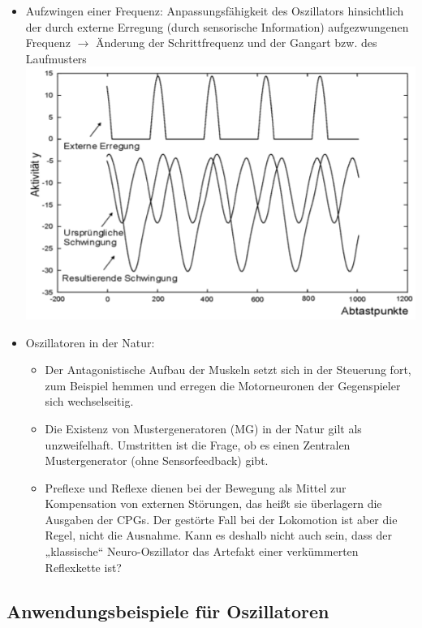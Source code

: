 \begin{itemize}
\begin{figure}[h!]
\begin{subfigure}{.4\textwidth}
		\caption{Oszillatordynamik}
		\label{OD}
	\end{subfigure}
\end{figure}
\item Aufzwingen einer Frequenz: Anpassungsfähigkeit des Oszillators hinsichtlich der durch
externe Erregung (durch sensorische Information) aufgezwungenen Frequenz $\rightarrow$ Änderung der Schrittfrequenz und der Gangart bzw. des Laufmusters\\
\includegraphics[width=.4\textwidth]{figures/ch05_freq.png}
\item Oszillatoren in der Natur:
\begin{itemize}
\item Der Antagonistische Aufbau der Muskeln setzt sich in der
Steuerung fort, zum Beispiel hemmen und erregen die
Motorneuronen der Gegenspieler sich wechselseitig.
\item Die Existenz von Mustergeneratoren (MG) in der Natur gilt als
unzweifelhaft. Umstritten ist die Frage, ob es einen Zentralen
Mustergenerator (ohne Sensorfeedback) gibt.
\item Preflexe und Reflexe dienen bei der Bewegung als Mittel zur
Kompensation von externen Störungen, das heißt sie
überlagern die Ausgaben der CPGs. Der gestörte Fall bei der
Lokomotion ist aber die Regel, nicht die Ausnahme. Kann es
deshalb nicht auch sein, dass der „klassische“ Neuro-Oszillator
das Artefakt einer verkümmerten Reflexkette ist?
\end{itemize}
\end{itemize}
\subsection{Anwendungsbeispiele für Oszillatoren}
